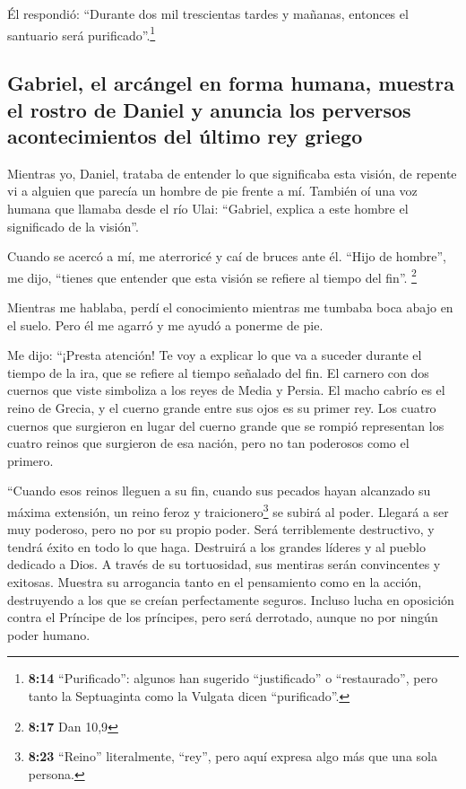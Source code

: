  Él respondió: ``Durante dos mil trescientas tardes y
mañanas, entonces el santuario será purificado''.\footnote{\textbf{8:14}
  ``Purificado'': algunos han sugerido ``justificado'' o ``restaurado'',
  pero tanto la Septuaginta como la Vulgata dicen ``purificado''.}

\hypertarget{gabriel-el-arcuxe1ngel-en-forma-humana-muestra-el-rostro-de-daniel-y-anuncia-los-perversos-acontecimientos-del-uxfaltimo-rey-griego}{%
\subsection{Gabriel, el arcángel en forma humana, muestra el rostro de
Daniel y anuncia los perversos acontecimientos del último rey
griego}\label{gabriel-el-arcuxe1ngel-en-forma-humana-muestra-el-rostro-de-daniel-y-anuncia-los-perversos-acontecimientos-del-uxfaltimo-rey-griego}}

 Mientras yo, Daniel, trataba de entender lo que
significaba esta visión, de repente vi a alguien que parecía un hombre
de pie frente a mí.  También oí una voz humana que
llamaba desde el río Ulai: ``Gabriel, explica a este hombre el
significado de la visión''.

 Cuando se acercó a mí, me aterroricé y caí de bruces
ante él. ``Hijo de hombre'', me dijo, ``tienes que entender que esta
visión se refiere al tiempo del fin''. \footnote{\textbf{8:17} Dan 10,9}

 Mientras me hablaba, perdí el conocimiento mientras me
tumbaba boca abajo en el suelo. Pero él me agarró y me ayudó a ponerme
de pie.

 Me dijo: ``¡Presta atención! Te voy a explicar lo que va
a suceder durante el tiempo de la ira, que se refiere al tiempo señalado
del fin.  El carnero con dos cuernos que viste simboliza
a los reyes de Media y Persia.  El macho cabrío es el
reino de Grecia, y el cuerno grande entre sus ojos es su primer rey.
 Los cuatro cuernos que surgieron en lugar del cuerno
grande que se rompió representan los cuatro reinos que surgieron de esa
nación, pero no tan poderosos como el primero.

 ``Cuando esos reinos lleguen a su fin, cuando sus
pecados hayan alcanzado su máxima extensión, un reino feroz y
traicionero\footnote{\textbf{8:23} ``Reino'' literalmente, ``rey'', pero
  aquí expresa algo más que una sola persona.} se subirá al poder.
 Llegará a ser muy poderoso, pero no por su propio poder.
Será terriblemente destructivo, y tendrá éxito en todo lo que haga.
Destruirá a los grandes líderes y al pueblo dedicado a Dios.
 A través de su tortuosidad, sus mentiras serán
convincentes y exitosas. Muestra su arrogancia tanto en el pensamiento
como en la acción, destruyendo a los que se creían perfectamente
seguros. Incluso lucha en oposición contra el Príncipe de los príncipes,
pero será derrotado, aunque no por ningún poder humano.

